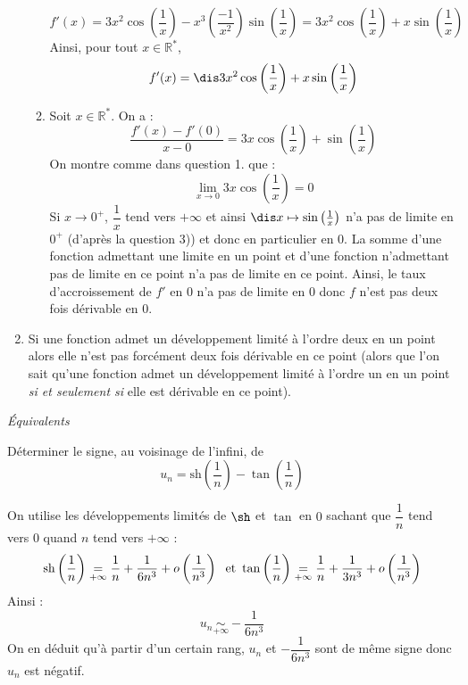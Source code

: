 \documentclass[a4paper,10pt]{report}
\begin{document}
\begin{enumerate}
\begin{enumerate}
$$ f'(x) = 3x^2 \cos \left( \frac{1}{x} \right) - x^3 \left( \frac{-1}{x^2} \right)  \sin \left( \frac{1}{x} \right) = 3x^2 \cos \left( \frac{1}{x} \right) + x  \sin \left( \frac{1}{x} \right)$$
Ainsi, pour tout $x \in \mathbb{R}^*$, 
$$f'(x) = \dis 3x^2 \cos \left( \frac{1}{x} \right) + x  \sin \left( \frac{1}{x} \right)$$
\item Soit $x \in \mathbb{R}^*$. On a :
$$ \frac{f'(x)-f'(0)}{x-0} = 3x \cos \left( \frac{1}{x} \right) +   \sin \left( \frac{1}{x} \right)$$
On montre comme dans question 1. que :
$$ \lim_{x \rightarrow 0} 3x \cos \left( \frac{1}{x} \right) = 0$$
Si $x \rightarrow 0^+$, $\dfrac{1}{x}$ tend vers $+ \infty$ et ainsi $\dis x \mapsto \sin \left( \frac{1}{x} \right)$ n'a pas de limite en $0^+$ (d'après la question 3)) et donc en particulier en $0$. La somme d'une fonction admettant une limite en un point et d'une fonction n'admettant pas de limite en ce point n'a pas de limite en ce point. Ainsi, le taux d'accroissement de $f'$ en $0$ n'a pas de limite en $0$ donc $f$ n'est pas deux fois dérivable en $0$.
\end{enumerate}
\item Si une fonction admet un développement limité à l'ordre deux en un point alors elle n'est pas forcément deux fois dérivable en ce point (alors que l'on sait qu'une fonction admet un développement limité à l'ordre un en un point \textit{si et seulement si} elle est dérivable en ce point).
\end{enumerate}

\medskip



\medskip

\begin{center}
\textit{{ {\large Équivalents}}}
\end{center}

\medskip


\begin{Exa} D\'{e}terminer le signe, au voisinage de l'infini, de 
$$u_{n}=\text{sh}\left( \dfrac{1}{n}\right) -\tan \left( \dfrac{1}{n}\right)$$
\end{Exa}

\corr On utilise les développements limités de $\sh$ et $\tan$ en $0$ sachant que $\dfrac{1}{n}$ tend vers $0$ quand $n$ tend vers $+ \infty$ : 
$$\textrm{sh} \left(\dfrac{1}{n} \right) \underset{+ \infty}{=} \dfrac{1}{n} + \dfrac{1}{{6n^3 }} + o\left( {\dfrac{1}{{n^3 }}} \right) \; \hbox{ et } \tan \left(\dfrac{1}{n}\right) \underset{+ \infty}{=} \dfrac{1}{n} + \dfrac{1}{{3n^3 }} + o\left( {\dfrac{1}{{n^3 }}} \right)$$
Ainsi :
$$u_n  \underset{+ \infty}{\sim } - \dfrac{1}{{6n^3 }}$$
On en déduit qu'à partir d'un certain rang, $u_n$ et $ - \dfrac{1}{{6n^3 }}$ sont de même signe donc $u_n$ est négatif.
\end{document}
